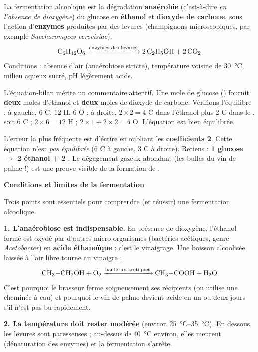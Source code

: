 \documentclass[11pt]{article}
\newcommand{\cle}[1]{{\popxbold\color{popdark}#1}}
\begin{document}
\begin{definition}
La \cle{fermentation alcoolique} est la dégradation \textbf{anaérobie} (c'est-à-dire \emph{en l'absence de dioxygène}) du glucose en \textbf{éthanol} et \textbf{dioxyde de carbone}, sous l'action d'\textbf{enzymes} produites par des levures (champignons microscopiques, par exemple \emph{Saccharomyces cerevisiae}).
\[ \ce{C6H12O6 ->[\text{enzymes des levures}] 2 C2H5OH + 2 CO2} \]
Conditions : absence d'air (anaérobiose stricte), température voisine de \SI{30}{\celsius}, milieu aqueux sucré, pH légèrement acide.
\end{definition}

L'équation-bilan mérite un commentaire attentif. Une mole de glucose () fournit \textbf{deux} moles d'éthanol et \textbf{deux} moles de dioxyde de carbone. Vérifions l'équilibre : à gauche, 6 C, 12 H, 6 O ; à droite, $2 \times 2 = 4$ C dans l'éthanol plus 2 C dans le , soit 6 C ; $2 \times 6 = 12$ H ; $2 \times 1 + 2 \times 2 = 6$ O. L'équation est bien équilibrée.

\begin{attention}
L'erreur la plus fréquente est d'écrire  en oubliant les \textbf{coefficients 2}. Cette équation n'est \emph{pas équilibrée} (6 C à gauche, 3 C à droite). Retiens : \textbf{1 glucose $\rightarrow$ 2 éthanol + 2 }. Le dégagement gazeux abondant (les bulles du vin de palme !) est une preuve visible de la formation de .
\end{attention}

\textbf{Conditions et limites de la fermentation}\par

Trois points sont essentiels pour comprendre (et réussir) une fermentation alcoolique.

\textbf{1. L'anaérobiose est indispensable.} En présence de dioxygène, l'éthanol formé est oxydé par d'autres micro-organismes (bactéries acétiques, genre \emph{Acetobacter}) en \textbf{acide éthanoïque}  : c'est le \cle{vinaigrage}. Une boisson alcoolisée laissée à l'air libre tourne au vinaigre :
\[ \ce{CH3-CH2OH + O2 ->[\text{bactéries acétiques}] CH3-COOH + H2O} \]
C'est pourquoi le brasseur ferme soigneusement ses récipients (ou utilise une cheminée à eau) et pourquoi le vin de palme devient acide en un ou deux jours s'il n'est pas bu rapidement.

\textbf{2. La température doit rester modérée} (environ \SIrange{25}{35}{\celsius}). En dessous, les levures sont paresseuses ; au-dessus de \SI{40}{\celsius} environ, elles meurent (dénaturation des enzymes) et la fermentation s'arrête.
\end{document}

